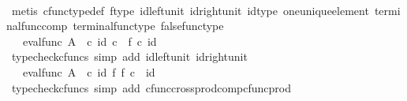 \begin{isabellebody}
\ \ \ \ \ \ \ \ \ \isamarkupfalse%
\ {\isacharparenleft}{\kern0pt}metis\ cfunc{\isacharunderscore}{\kern0pt}type{\isacharunderscore}{\kern0pt}def\ f{\isacharunderscore}{\kern0pt}type\ id{\isacharunderscore}{\kern0pt}left{\isacharunderscore}{\kern0pt}unit\ id{\isacharunderscore}{\kern0pt}right{\isacharunderscore}{\kern0pt}unit\ id{\isacharunderscore}{\kern0pt}type\ one{\isacharunderscore}{\kern0pt}unique{\isacharunderscore}{\kern0pt}element\ terminal{\isacharunderscore}{\kern0pt}func{\isacharunderscore}{\kern0pt}comp\ terminal{\isacharunderscore}{\kern0pt}func{\isacharunderscore}{\kern0pt}type\ false{\isacharunderscore}{\kern0pt}func{\isacharunderscore}{\kern0pt}type{\isacharparenright}{\kern0pt}\isanewline
\ \ \ \ \ \ \ \isamarkupfalse%
\ \isamarkupfalse%
\ {\isachardoublequoteopen}{\isachardot}{\kern0pt}{\isachardot}{\kern0pt}{\isachardot}{\kern0pt}\ {\isacharequal}{\kern0pt}\ eval{\isacharunderscore}{\kern0pt}func\ A\ {\isasymOmega}\ {\isasymcirc}\isactrlsub c\ {\isasymlangle}id{\isacharparenleft}{\kern0pt}{\isasymOmega}{\isacharparenright}{\kern0pt}\ {\isasymcirc}\isactrlsub c\ {\isasymf}{\isacharcomma}{\kern0pt}\ f\ {\isasymcirc}\isactrlsub c\ id{\isacharparenleft}{\kern0pt}{\isasymone}{\isacharparenright}{\kern0pt}{\isasymrangle}{\isachardoublequoteclose}\isanewline
\ \ \ \ \ \ \ \ \ \isamarkupfalse%
\ {\isacharparenleft}{\kern0pt}typecheck{\isacharunderscore}{\kern0pt}cfuncs{\isacharcomma}{\kern0pt}\ simp\ add{\isacharcolon}{\kern0pt}\ id{\isacharunderscore}{\kern0pt}left{\isacharunderscore}{\kern0pt}unit{}\ id{\isacharunderscore}{\kern0pt}right{\isacharunderscore}{\kern0pt}unit{}{\isacharparenright}{\kern0pt}\isanewline
\ \ \ \ \ \ \ \isamarkupfalse%
\ \isamarkupfalse%
\ {\isachardoublequoteopen}{\isachardot}{\kern0pt}{\isachardot}{\kern0pt}{\isachardot}{\kern0pt}\ {\isacharequal}{\kern0pt}\ eval{\isacharunderscore}{\kern0pt}func\ A\ {\isasymOmega}\ {\isasymcirc}\isactrlsub c\ {\isacharparenleft}{\kern0pt}id{\isacharparenleft}{\kern0pt}{\isasymOmega}{\isacharparenright}{\kern0pt}\ {\isasymtimes}\isactrlsub f\ f{\isacharparenright}{\kern0pt}\ {\isasymcirc}\isactrlsub c\ {\isasymlangle}{\isasymf}{\isacharcomma}{\kern0pt}\ id{\isacharparenleft}{\kern0pt}{\isasymone}{\isacharparenright}{\kern0pt}{\isasymrangle}{\isachardoublequoteclose}\isanewline
\ \ \ \ \ \ \ \ \ \isamarkupfalse%
\ {\isacharparenleft}{\kern0pt}typecheck{\isacharunderscore}{\kern0pt}cfuncs{\isacharcomma}{\kern0pt}\ simp\ add{\isacharcolon}{\kern0pt}\ cfunc{\isacharunderscore}{\kern0pt}cross{\isacharunderscore}{\kern0pt}prod{\isacharunderscore}{\kern0pt}comp{\isacharunderscore}{\kern0pt}cfunc{\isacharunderscore}{\kern0pt}prod{\isacharparenright}{\kern0pt}\isanewline

\end{isabellebody}
